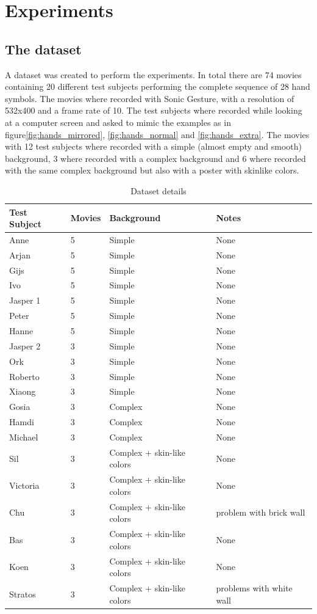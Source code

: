 \chapter{Experiments}
\label{ch:experiments}


\section{The dataset}
A dataset was created to perform the experiments. In total there are 74 movies containing 20 different test subjects performing the complete sequence of 28 hand symbols. The movies where recorded with Sonic Gesture, with a resolution of 532x400 and a frame rate of 10. The test subjects where recorded while looking at a computer screen and asked to mimic the examples as in figure\ref{fig:hands_mirrored}, \ref{fig:hands_normal} and \ref{fig:hands_extra}. The movies with 12 test subjects where recorded with a simple (almost empty and smooth) background, 3 where recorded with a complex background and 6 where recorded with the same complex background but also with a poster with skinlike colors.

\begin{table}
\centering
\begin{tabular}{llll}
\hline\hline
	Test Subject & Movies & Background & Notes \\
\hline
	Anne     & 5 & Simple & None \\
	Arjan    & 5 & Simple & None \\
	Gijs     & 5 & Simple & None \\
	Ivo      & 5 & Simple & None \\
	Jasper 1 & 5 & Simple & None \\
	Peter    & 5 & Simple & None \\
	Hanne    & 5 & Simple & None \\
	Jasper 2 & 3 & Simple & None \\
	Ork      & 3 & Simple & None \\
	Roberto  & 3 & Simple & None \\
	Xiaong   & 3 & Simple & None \\
	\hline			
	Gosia    & 3 & Complex & None \\
	Hamdi    & 3 & Complex & None \\
	Michael  & 3 & Complex & None \\
	Sil      & 3 & Complex + skin-like colors & None \\
	Victoria & 3 & Complex + skin-like colors & None \\
	Chu      & 3 & Complex + skin-like colors & problem with brick wall \\
	\hline	
	Bas      & 3 & Complex + skin-like colors & None \\
	Koen     & 3 & Complex + skin-like colors & None \\
	Stratos  & 3 & Complex + skin-like colors & problems with white wall \\
\hline
\end{tabular}
\caption{Dataset details}
\end{table}

